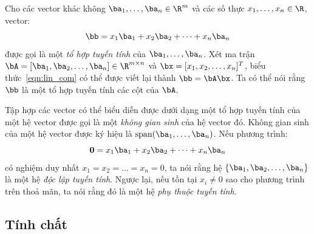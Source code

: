 Cho các vector khác không $\ba_1, \dots, \ba_n \in \R^m$ và các số thực $x_1,
\dots, x_n \in \R$,
vector:
\begin{equation}
    \label{eqn:lin_com}
    \bb = x_1\ba_1 + x_2\ba_2 + \dots + x_n \ba_n
\end{equation}
được gọi là một \textit{tổ hợp tuyến tính} của $\ba_1, \dots, \ba_n$. Xét ma
trận $\bA = [\ba_1, \ba_2, \dots, \ba_n] \in
\R^{m\times n}$ và $\bx = [x_1, x_2, \dots, x_n]^T$, biểu
thức~\eqref{eqn:lin_com} có thể được viết lại thành $\bb = \bA\bx$. Ta có thể
nói rằng $\bb$ là một tổ hợp tuyến tính các cột của $\bA$.


Tập hợp các vector có thể biểu diễn được dưới dạng một tổ hợp tuyến tính
của một hệ vector được gọi là một \textit{không gian sinh} của hệ vector đó.
Không gian sinh của một hệ vector được ký hiệu là $\text{span}(\ba_1,
\dots, \ba_n)$. Nếu phương trình:
\begin{equation}
    \label{eqn:lin_com0}
    \mathbf{0} = x_1\ba_1 + x_2\ba_2 + \dots + x_n \ba_n
\end{equation}
\noindent có nghiệm duy nhất $x_1 = x_2 = \dots = x_n = 0$, ta nói rằng hệ $
\{\ba_1, \ba_2, \dots, \ba_n\}$ là một hệ \textit{độc lập tuyến tính}. Ngược
lại, nếu tồn tại $x_i \neq 0$ sao cho phương trình trên thoả mãn, ta nói rằng đó
là một hệ \textit{phụ thuộc tuyến tính}.


\subsection{Tính chất} %
\label{sub:thtt_tinh_chat}



